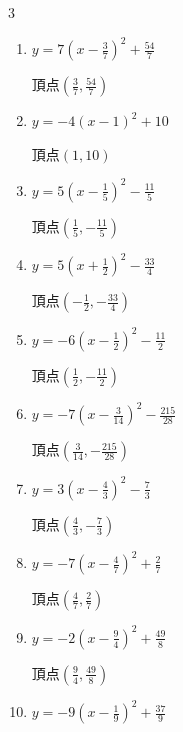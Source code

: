 \begin{multicols}{3}
\begin{enumerate}
        $\displaystyle 頂点\left( \frac{9}{4} , \frac{121}{8} \right)$

  \item $\displaystyle y=7\left( x-\frac{3}{7}\right)^{2}+\frac{54}{7}$

        $\displaystyle 頂点\left( \frac{3}{7} , \frac{54}{7} \right)$

  \item $\displaystyle y=-4\left( x-1\right)^{2}+10$

        $\displaystyle 頂点\left( 1 , 10 \right)$

\columnbreak %

  \item $\displaystyle y=5\left( x-\frac{1}{5}\right)^{2}-\frac{11}{5}$

        $\displaystyle 頂点\left( \frac{1}{5} , -\frac{11}{5} \right)$

  \item $\displaystyle y=5\left( x+\frac{1}{2}\right)^{2}-\frac{33}{4}$

        $\displaystyle 頂点\left( -\frac{1}{2} , -\frac{33}{4} \right)$

  \item $\displaystyle y=-6\left( x-\frac{1}{2}\right)^{2}-\frac{11}{2}$

        $\displaystyle 頂点\left( \frac{1}{2} , -\frac{11}{2} \right)$

  \item $\displaystyle y=-7\left( x-\frac{3}{14}\right)^{2}-\frac{215}{28}$

        $\displaystyle 頂点\left( \frac{3}{14} , -\frac{215}{28} \right)$

  \item $\displaystyle y=3\left( x-\frac{4}{3}\right)^{2}-\frac{7}{3}$

        $\displaystyle 頂点\left( \frac{4}{3} , -\frac{7}{3} \right)$

  \item $\displaystyle y=-7\left( x-\frac{4}{7}\right)^{2}+\frac{2}{7}$

        $\displaystyle 頂点\left( \frac{4}{7} , \frac{2}{7} \right)$

  \item $\displaystyle y=-2\left( x-\frac{9}{4}\right)^{2}+\frac{49}{8}$

        $\displaystyle 頂点\left( \frac{9}{4} , \frac{49}{8} \right)$

  \item $\displaystyle y=-9\left( x-\frac{1}{9}\right)^{2}+\frac{37}{9}$


\end{enumerate}
\end{multicols}
